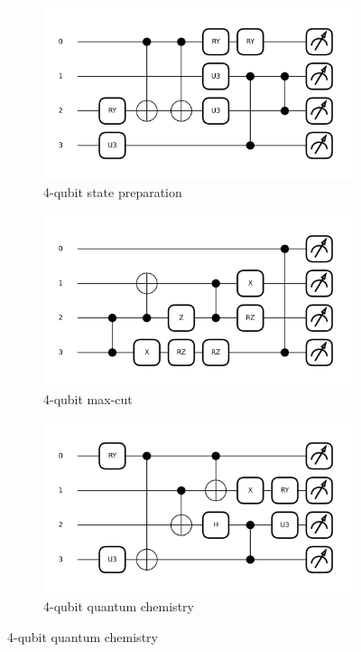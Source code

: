 \documentclass{article} %
\begin{document}
\begin{figure}[ht]
\begin{center}
    \begin{subfigure}[b]{0.275\textwidth}
    \centering
    \includegraphics[width=\textwidth]{images/best_candidate/4-qubits-fidelity_best_candidate_77132.png}

    \caption{4-qubit state preparation}
    \end{subfigure}
    \hfill
    \begin{subfigure}[b]{0.275\textwidth}
    \centering
    \includegraphics[width=\textwidth]{images/best_candidate/4-qubits-maxcut_best_candidate_14109.png}
    \caption{4-qubit max-cut}
    \end{subfigure}
    \hfill
    \begin{subfigure}[b]{0.275\textwidth}
    \centering
    \includegraphics[width=\textwidth]{images/best_candidate/4-qubits-vqe_best_candidate_94071.png}
    \caption{4-qubit quantum chemistry}
    \end{subfigure}


\end{center}
\end{figure}
\end{document}
